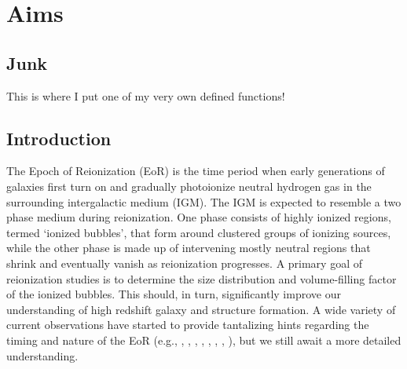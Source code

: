 \chapter{Aims}

\ifpdf
    \graphicspath{{bubble_finding/figures/PNG/}{bubble_finding/figures/PDF/}{bubble_finding/figures/}}
\else
    \graphicspath{{bubble_finding/figures/EPS/}{example_chapter/figures/}}
\fi



\section{Junk}
This is where I put one of my very own defined functions!




\section{Introduction} \label{sec:intro}
 
The Epoch of Reionization (EoR) is the time period when early generations
of galaxies first turn on and gradually photoionize neutral hydrogen
gas in the surrounding intergalactic medium (IGM). The IGM
is expected to resemble a two phase medium during reionization.
One phase consists of highly ionized regions, termed `ionized bubbles', that form around clustered
groups of ionizing sources, while the other phase is made up of intervening mostly neutral regions that
shrink and eventually vanish as reionization progresses. A primary goal
of reionization studies is to determine the size distribution and volume-filling factor of
the ionized bubbles. This should, in turn, significantly improve our understanding of high
redshift galaxy and structure formation. 
A wide variety of current
observations have started to provide tantalizing hints regarding the timing and nature of the EoR (e.g., \citealt{Fan:2005es}, \citealt{Totani:2005ng}, 
\citealt{Dunkley:2008ie}, \citealt{Ouchi:2010}, \citealt{Bouwens:2011xu}, \citealt{Mortlock:2011va}, \citealt{Zahn:2011vp}, \citealt{Schenker:2011ea}),
but we still await a more detailed understanding. 

